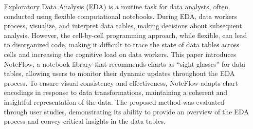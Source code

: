 Exploratory Data Analysis (EDA) is a routine task for data analysts, often conducted using flexible computational notebooks. During EDA, data workers process, visualize, and interpret data tables, making decisions about subsequent analysis. However, the cell-by-cell programming approach, while flexible, can lead to disorganized code, making it difficult to trace the state of data tables across cells and increasing the cognitive load on data workers. This paper introduces NoteFlow, a notebook library that recommends charts as ``sight glasses'' for data tables, allowing users to monitor their dynamic updates throughout the EDA process. To ensure visual consistency and effectiveness, NoteFlow adapts chart encodings in response to data transformations, maintaining a coherent and insightful representation of the data. The proposed method was evaluated through user studies, demonstrating its ability to provide an overview of the EDA process and convey critical insights in the data tables. 
